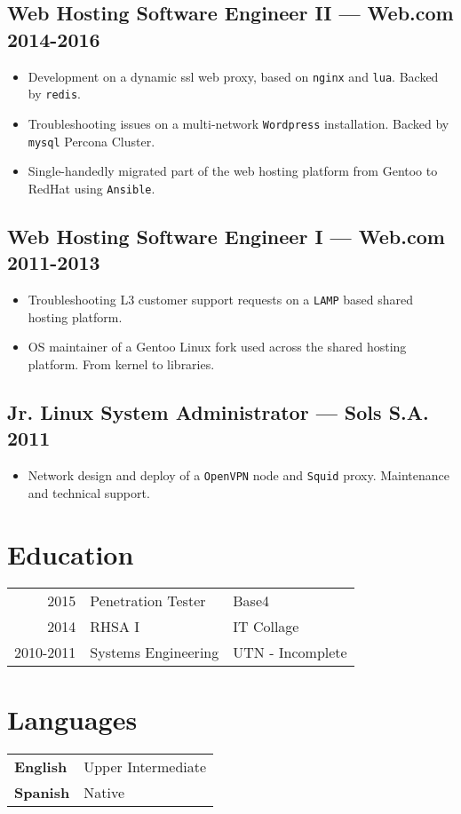 \documentclass[11pt]{article}
\begin{document}
\subsection{Web Hosting Software Engineer II --- Web.com \hfill 2014-2016}
\begin{itemize}
\item Development on a dynamic ssl web proxy, based on \texttt{nginx} and \texttt{lua}. Backed by \texttt{redis}.
\item Troubleshooting issues on a multi-network \texttt{Wordpress} installation. Backed by \texttt{mysql} Percona Cluster.
\item Single-handedly migrated part of the web hosting platform from Gentoo to RedHat using \texttt{Ansible}.
\end{itemize}

\subsection{Web Hosting Software Engineer I --- Web.com \hfill 2011-2013}
\begin{itemize}
\item Troubleshooting L3 customer support requests on a \texttt{LAMP} based shared hosting platform.
\item OS maintainer of a Gentoo Linux fork used across the shared hosting platform. From kernel to libraries.
\end{itemize}

\subsection{Jr. Linux System Administrator --- Sols S.A. \hfill 2011}
\begin{itemize}
\item Network design and deploy of a \texttt{OpenVPN} node and \texttt{Squid} proxy. Maintenance and technical support.
\end{itemize}

\begin{multicols}{2}
  \section{Education}
    \begin{tabular}{ @{}r | p{} | l }
      2015      & Penetration Tester  & {Base4} \\
      2014      & RHSA I              & {IT Collage} \\
      2010-2011 & Systems Engineering & {UTN - Incomplete}
    \end{tabular}
  \columnbreak
  \section{Languages}
  \begin{tabular}{ l l }
    \hspace{.1em} \textbf{English} & Upper Intermediate \\
    \hspace{.1em} \textbf{Spanish} & Native \\
  \end{tabular}
\end{multicols}
\end{document}
